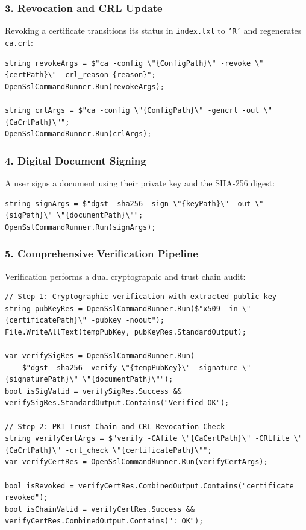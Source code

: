 \documentclass[12pt,a4paper]{article}
\begin{document}
\subsubsection{3. Revocation and CRL Update}
Revoking a certificate transitions its status in \texttt{index.txt} to \texttt{'R'} and regenerates \texttt{ca.crl}:
\begin{lstlisting}
string revokeArgs = $"ca -config \"{ConfigPath}\" -revoke \"{certPath}\" -crl_reason {reason}";
OpenSslCommandRunner.Run(revokeArgs);

string crlArgs = $"ca -config \"{ConfigPath}\" -gencrl -out \"{CaCrlPath}\"";
OpenSslCommandRunner.Run(crlArgs);
\end{lstlisting}

\subsubsection{4. Digital Document Signing}
A user signs a document using their private key and the SHA-256 digest:
\begin{lstlisting}
string signArgs = $"dgst -sha256 -sign \"{keyPath}\" -out \"{sigPath}\" \"{documentPath}\"";
OpenSslCommandRunner.Run(signArgs);
\end{lstlisting}

\subsubsection{5. Comprehensive Verification Pipeline}
Verification performs a dual cryptographic and trust chain audit:
\begin{lstlisting}
// Step 1: Cryptographic verification with extracted public key
string pubKeyRes = OpenSslCommandRunner.Run($"x509 -in \"{certificatePath}\" -pubkey -noout");
File.WriteAllText(tempPubKey, pubKeyRes.StandardOutput);

var verifySigRes = OpenSslCommandRunner.Run(
    $"dgst -sha256 -verify \"{tempPubKey}\" -signature \"{signaturePath}\" \"{documentPath}\"");
bool isSigValid = verifySigRes.Success && verifySigRes.StandardOutput.Contains("Verified OK");

// Step 2: PKI Trust Chain and CRL Revocation Check
string verifyCertArgs = $"verify -CAfile \"{CaCertPath}\" -CRLfile \"{CaCrlPath}\" -crl_check \"{certificatePath}\"";
var verifyCertRes = OpenSslCommandRunner.Run(verifyCertArgs);

bool isRevoked = verifyCertRes.CombinedOutput.Contains("certificate revoked");
bool isChainValid = verifyCertRes.Success && verifyCertRes.CombinedOutput.Contains(": OK");
\end{lstlisting}
\end{document}
